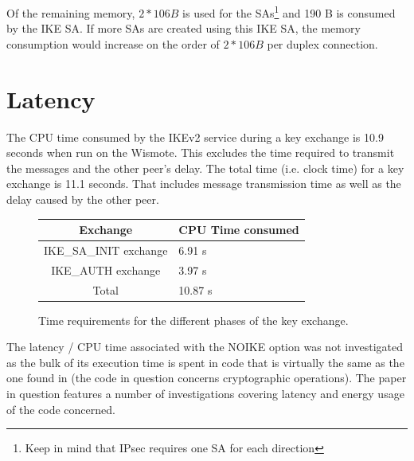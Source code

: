 \documentclass[final,a4paper,twoside,11pt,onecolumn]{report}
\begin{document}
Of the remaining memory, $2 * 106 B$ is used for the SAs\footnote{Keep in mind that IPsec requires one SA for each direction} and 190 B is consumed by the IKE SA. If more SAs are created using this IKE SA, the memory consumption would increase on the order of $2 * 106 B$ per duplex connection.
% 

\section{Latency}
The CPU time consumed by the IKEv2 service during a key exchange is 10.9 seconds when run on the Wismote. This excludes the time required to transmit the messages and the other peer's delay. The total time (i.e. clock time) for a key exchange is 11.1 seconds. That includes message transmission time as well as the delay caused by the other peer.

\begin{figure}[h]
\centering
\begin{tabular}{c|l}                        
Exchange                   & CPU Time consumed     \\ \hline
IKE\_SA\_INIT exchange     & 6.91 s                \\
IKE\_AUTH exchange         & 3.97 s                \\
Total                      & 10.87 s            
\end{tabular}                                   
\caption{Time requirements for the different phases of the key exchange.}
\end{figure}

\label{sec:latency-similar}
The latency / CPU time associated with the NOIKE option was not investigated as the bulk of its execution time is spent in code  that is virtually the same as the one found in \cite{raza11securing} (the code in question concerns cryptographic operations). The paper in question features a number of investigations covering latency and energy usage of the code concerned.
\end{document}
